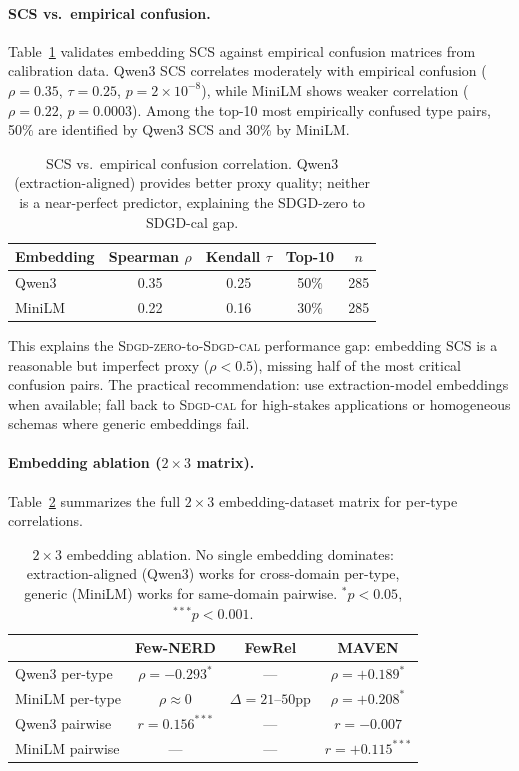 \documentclass[11pt,a4paper]{article}
\newcommand{\sdgdzero}{\textsc{Sdgd-zero}}
\newcommand{\sdgdcal}{\textsc{Sdgd-cal}}
\begin{document}
\paragraph{SCS vs.\ empirical confusion.}
\label{sec:scs-validation}
Table~\ref{tab:scs-confusion} validates embedding SCS against empirical confusion matrices from calibration data.
Qwen3 SCS correlates moderately with empirical confusion ($\rho{=}0.35$, $\tau{=}0.25$, $p{=}2 \times 10^{-8}$), while MiniLM shows weaker correlation ($\rho{=}0.22$, $p{=}0.0003$).
Among the top-10 most empirically confused type pairs, 50\% are identified by Qwen3 SCS and 30\% by MiniLM.

\begin{table}[t]
\centering
\small
\begin{tabular}{lcccc}
\toprule
\textbf{Embedding} & \textbf{Spearman $\rho$} & \textbf{Kendall $\tau$} & \textbf{Top-10} & $n$ \\
\midrule
Qwen3  & 0.35 & 0.25 & 50\% & 285 \\
MiniLM & 0.22 & 0.16 & 30\% & 285 \\
\bottomrule
\end{tabular}
\caption{SCS vs.\ empirical confusion correlation. Qwen3 (extraction-aligned) provides better proxy quality; neither is a near-perfect predictor, explaining the SDGD-zero to SDGD-cal gap.}
\label{tab:scs-confusion}
\end{table}

This explains the \sdgdzero{}-to-\sdgdcal{} performance gap: embedding SCS is a reasonable but imperfect proxy ($\rho{<}0.5$), missing half of the most critical confusion pairs.
The practical recommendation: use extraction-model embeddings when available; fall back to \sdgdcal{} for high-stakes applications or homogeneous schemas where generic embeddings fail.

\paragraph{Embedding ablation ($2{\times}3$ matrix).}
Table~\ref{tab:embedding-ablation} summarizes the full $2{\times}3$ embedding-dataset matrix for per-type correlations.

\begin{table}[t]
\centering
\small
\begin{tabular}{lccc}
\toprule
 & \textbf{Few-NERD} & \textbf{FewRel} & \textbf{MAVEN} \\
\midrule
Qwen3 per-type & $\rho{=}-0.293^{*}$ & --- & $\rho{=}+0.189^{*}$ \\
MiniLM per-type & $\rho{\approx}0$ & $\Delta{=}21$--$50$pp & $\rho{=}+0.208^{*}$ \\
\midrule
Qwen3 pairwise & $r{=}0.156^{***}$ & --- & $r{=}-0.007$ \\
MiniLM pairwise & --- & --- & $r{=}+0.115^{***}$ \\
\bottomrule
\end{tabular}
\caption{$2{\times}3$ embedding ablation. No single embedding dominates: extraction-aligned (Qwen3) works for cross-domain per-type, generic (MiniLM) works for same-domain pairwise. $^{*}p{<}0.05$, $^{***}p{<}0.001$.}
\label{tab:embedding-ablation}
\end{table}
\end{document}
